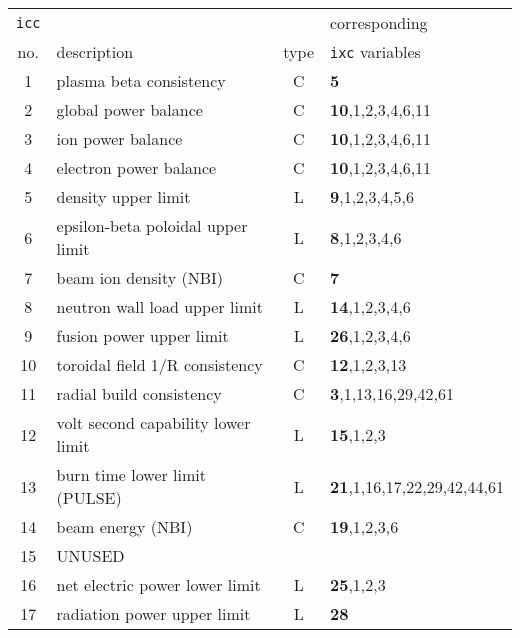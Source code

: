 \documentclass[11pt,a4paper]{report}
\begin{document}
\begin{table}[tbph]
\begin{center}
\begin{tabular}{||c|l|c|l||} \hline
\texttt{icc} &                                                  &      & corresponding \\
no. & description                                               & type & \texttt{ixc} variables \\ \hline
1   & plasma beta consistency                                   & C    & \textbf{5} \\
2   & global power balance                                      & C    & \textbf{10},1,2,3,4,6,11 \\
3   & ion power balance                                         & C    & \textbf{10},1,2,3,4,6,11 \\
4   & electron power balance                                    & C    & \textbf{10},1,2,3,4,6,11 \\
5   & density upper limit                                       & L    & \textbf{9},1,2,3,4,5,6 \\
6   & epsilon-beta poloidal upper limit                         & L    & \textbf{8},1,2,3,4,6 \\
7   & beam ion density (NBI)                                    & C    & \textbf{7} \\
8   & neutron wall load upper limit                             & L    & \textbf{14},1,2,3,4,6 \\
9   & fusion power upper limit                                  & L    & \textbf{26},1,2,3,4,6 \\
10  & toroidal field 1/R consistency                            & C    & \textbf{12},1,2,3,13 \\
11  & radial build consistency                                  & C    & \textbf{3},1,13,16,29,42,61 \\
12  & volt second capability lower limit                        & L    & \textbf{15},1,2,3 \\
13  & burn time lower limit (PULSE)                             & L    & \textbf{21},1,16,17,22,29,42,44,61 \\
14  & beam energy (NBI)                                         & C    & \textbf{19},1,2,3,6 \\
15  & UNUSED                                                    &      & \\
16  & net electric power lower limit                            & L    & \textbf{25},1,2,3 \\
17  & radiation power upper limit                               & L    & \textbf{28} \\

\end{tabular}
\end{center}
\end{table}
\end{document}
